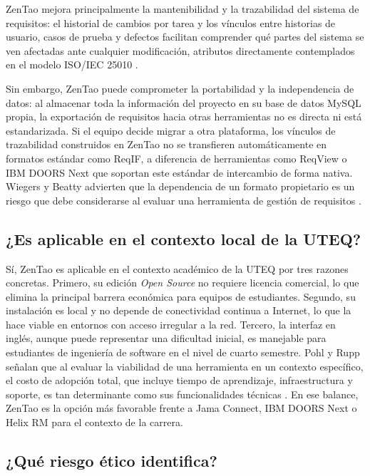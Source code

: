 \documentclass[journal,onecolumn]{IEEEtran}
\begin{document}
ZenTao mejora principalmente la mantenibilidad y la trazabilidad
del sistema de requisitos: el historial de cambios por tarea y los vínculos entre historias de
usuario, casos de prueba y defectos facilitan comprender qué partes del sistema se ven afectadas
ante cualquier modificación, atributos directamente contemplados en el modelo ISO/IEC 25010
\cite{iso25010}.

Sin embargo, ZenTao puede comprometer la portabilidad y la independencia
de datos: al almacenar toda la información del proyecto en su base de datos MySQL propia,
la exportación de requisitos hacia otras herramientas no es directa ni está estandarizada. Si el
equipo decide migrar a otra plataforma, los vínculos de trazabilidad construidos en ZenTao
no se transfieren automáticamente en formatos estándar como ReqIF, a diferencia de herramientas
como ReqView o IBM DOORS Next que soportan este estándar de intercambio de forma nativa.
Wiegers y Beatty advierten que la dependencia de un formato propietario es un riesgo que
debe considerarse al evaluar una herramienta de gestión de requisitos \cite{wiegers2013}.

\subsection{¿Es aplicable en el contexto local de la UTEQ?}

Sí, ZenTao es aplicable en el contexto académico de la UTEQ por tres razones concretas. Primero,
su edición \textit{Open Source} no requiere licencia comercial, lo que elimina la principal barrera
económica para equipos de estudiantes. Segundo, su instalación es local y no depende de
conectividad continua a Internet, lo que la hace viable en entornos con acceso irregular a la red.
Tercero, la interfaz en inglés, aunque puede representar una dificultad inicial, es manejable para
estudiantes de ingeniería de software en el nivel de cuarto semestre. Pohl y Rupp señalan que
al evaluar la viabilidad de una herramienta en un contexto específico, el costo de adopción total,
que incluye tiempo de aprendizaje, infraestructura y soporte, es tan determinante como sus
funcionalidades técnicas \cite{pohl2015}. En ese balance, ZenTao es la opción más favorable
frente a Jama Connect, IBM DOORS Next o Helix RM para el contexto de la carrera.

\subsection{¿Qué riesgo ético identifica?}
\end{document}
